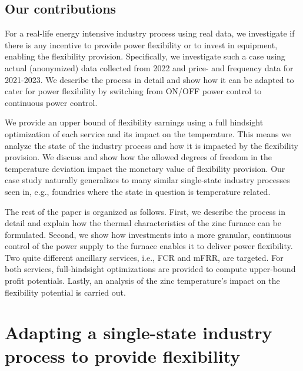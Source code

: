 \documentclass[sigconf]{acmart}
\begin{document}
\subsection{Our contributions}

For a real-life energy intensive industry process using real data, we investigate if there is any incentive to provide power flexibility or to invest in equipment, enabling the flexibility provision.
%
Specifically, we investigate such a case using actual (anonymized) data collected from 2022 and price- and frequency data for 2021-2023. We describe the process in detail and show how it can be adapted to cater for power flexibility by switching from ON/OFF power control to continuous power control.

We provide an upper bound of flexibility earnings using a full hindsight optimization of each service and its impact on the temperature. This means we analyze the state of the industry process and how it is impacted by the flexibility provision. We discuss and show how the allowed degrees of freedom in the temperature deviation impact the monetary value of flexibility provision.
Our case study naturally generalizes to many similar single-state industry processes seen in, e.g., foundries where the state in question is temperature related.


The rest of the paper is organized as follows. First, we describe the process in detail and explain how the thermal characteristics of the zinc furnace can be formulated. Second, we show how investments into a more granular, continuous control of the power supply to the furnace enables it to deliver power flexibility. Two quite different ancillary services, i.e., FCR and mFRR, are targeted. For both services, full-hindsight optimizations are provided to compute upper-bound profit potentials. Lastly, an analysis of the zinc temperature's impact on the flexibility potential is carried out.


\section{Adapting a single-state industry process to provide flexibility}\label{sec:zinc_furnace_description}
\end{document}
